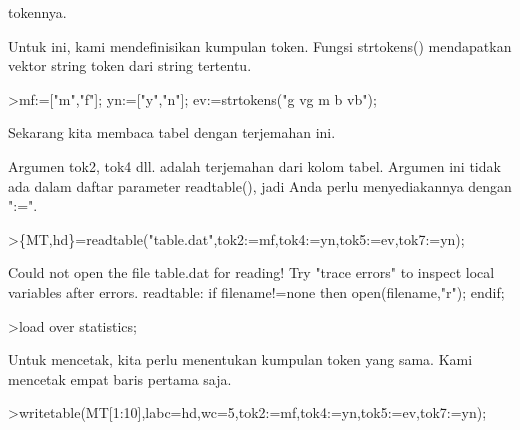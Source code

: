 \documentclass[a4paper,10pt]{article}
\begin{document}
\begin{eulernotebook}
\begin{eulercomment}
\begin{eulercomment}
\begin{eulercomment}
\begin{eulercomment}
\begin{eulercomment}
\begin{eulercomment}
\begin{eulercomment}
\begin{eulercomment}
\begin{eulercomment}
\begin{eulercomment}
\begin{eulercomment}
\begin{eulercomment}
\begin{eulercomment}
\begin{eulercomment}
\begin{eulercomment}
\begin{eulercomment}
\begin{eulercomment}
\begin{eulercomment}
\begin{eulercomment}
\begin{eulercomment}
\begin{eulercomment}
\begin{eulercomment}
\begin{eulercomment}
\begin{eulercomment}
\begin{eulercomment}
\begin{eulercomment}
\begin{eulercomment}
\begin{eulercomment}
\begin{eulercomment}
\begin{eulercomment}
\begin{eulercomment}
\begin{eulercomment}
\begin{eulercomment}
\begin{eulercomment}
\begin{eulercomment}
\begin{eulercomment}
\begin{eulercomment}
\begin{eulercomment}
\begin{eulercomment}
\begin{eulercomment}
\begin{eulercomment}
\begin{eulercomment}
\begin{eulercomment}
\begin{eulercomment}
\begin{eulercomment}
\begin{eulercomment}
\begin{eulercomment}
\begin{eulercomment}
\begin{eulercomment}
\begin{eulercomment}
\begin{eulercomment}
\begin{eulercomment}
\begin{eulercomment}
\begin{eulercomment}
\begin{eulercomment}
\begin{eulercomment}
\begin{eulercomment}
\begin{eulercomment}
\begin{eulercomment}
\begin{eulercomment}
\begin{eulercomment}
\begin{eulercomment}
\begin{eulercomment}
\begin{eulercomment}
\begin{eulercomment}
\begin{eulercomment}
\begin{eulercomment}
tokennya.

Untuk ini, kami mendefinisikan kumpulan token. Fungsi strtokens()
mendapatkan vektor string token dari string tertentu.
\end{eulercomment}
\begin{eulerprompt}
>mf:=["m","f"]; yn:=["y","n"]; ev:=strtokens("g vg m b vb");
\end{eulerprompt}
\begin{eulercomment}
Sekarang kita membaca tabel dengan terjemahan ini.

Argumen tok2, tok4 dll. adalah terjemahan dari kolom tabel. Argumen
ini tidak ada dalam daftar parameter readtable(), jadi Anda perlu
menyediakannya dengan ":=".
\end{eulercomment}
\begin{eulerprompt}
>\{MT,hd\}=readtable("table.dat",tok2:=mf,tok4:=yn,tok5:=ev,tok7:=yn);
\end{eulerprompt}
\begin{euleroutput}
  Could not open the file
  table.dat
  for reading!
  Try "trace errors" to inspect local variables after errors.
  readtable:
      if filename!=none then open(filename,"r"); endif;
\end{euleroutput}
\begin{eulerprompt}
>load over statistics;
\end{eulerprompt}
\begin{eulercomment}
Untuk mencetak, kita perlu menentukan kumpulan token yang sama. Kami
mencetak empat baris pertama saja.
\end{eulercomment}
\begin{eulerprompt}
>writetable(MT[1:10],labc=hd,wc=5,tok2:=mf,tok4:=yn,tok5:=ev,tok7:=yn);
\end{eulerprompt}
\begin{euleroutput}
  
\end{euleroutput}
\end{eulercomment}
\end{eulercomment}
\end{eulercomment}
\end{eulercomment}
\end{eulercomment}
\end{eulercomment}
\end{eulercomment}
\end{eulercomment}
\end{eulercomment}
\end{eulercomment}
\end{eulercomment}
\end{eulercomment}
\end{eulercomment}
\end{eulercomment}
\end{eulercomment}
\end{eulercomment}
\end{eulercomment}
\end{eulercomment}
\end{eulercomment}
\end{eulercomment}
\end{eulercomment}
\end{eulercomment}
\end{eulercomment}
\end{eulercomment}
\end{eulercomment}
\end{eulercomment}
\end{eulercomment}
\end{eulercomment}
\end{eulercomment}
\end{eulercomment}
\end{eulercomment}
\end{eulercomment}
\end{eulercomment}
\end{eulercomment}
\end{eulercomment}
\end{eulercomment}
\end{eulercomment}
\end{eulercomment}
\end{eulercomment}
\end{eulercomment}
\end{eulercomment}
\end{eulercomment}
\end{eulercomment}
\end{eulercomment}
\end{eulercomment}
\end{eulercomment}
\end{eulercomment}
\end{eulercomment}
\end{eulercomment}
\end{eulercomment}
\end{eulercomment}
\end{eulercomment}
\end{eulercomment}
\end{eulercomment}
\end{eulercomment}
\end{eulercomment}
\end{eulercomment}
\end{eulercomment}
\end{eulercomment}
\end{eulercomment}
\end{eulercomment}
\end{eulercomment}
\end{eulercomment}
\end{eulercomment}
\end{eulercomment}
\end{eulercomment}
\end{eulernotebook}
\end{document}
